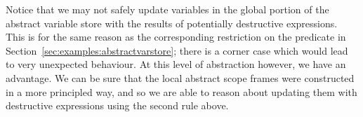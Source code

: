 \documentclass{article}
\begin{document}
Notice that we may not safely
update variables in the global portion of the abstract variable store with the
results of potentially destructive expressions. This is for the same reason as
the corresponding restriction on the \store predicate in
Section~\ref{sec:examples:abstractvarstore};  there is a corner case which would
lead to very unexpected behaviour. At this level of abstraction however, we
have an advantage. We can be sure that the local abstract scope frames
were constructed in a more principled way, and so we are able to reason about
updating them with destructive expressions using
the second rule above. %


\end{document}

